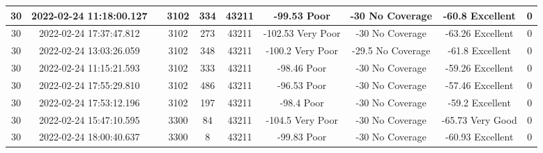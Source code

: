 \begin{longtable*}{|c|c|c|c|c|c|c|c|c|c|}
30&2022-02-24 11:18:00.127&&3102&334&43211& -99.53    Poor        & -30       No Coverage & -60.8     Excellent   & 0\\\hline
{}30&2022-02-24 17:37:47.812&&3102&273&43211& -102.53   Very Poor   & -30       No Coverage & -63.26    Excellent   & 0\\\hline
{}30&2022-02-24 13:03:26.059&&3102&348&43211& -100.2    Very Poor   & -29.5     No Coverage & -61.8     Excellent   & 0\\\hline
{}30&2022-02-24 11:15:21.593&&3102&333&43211& -98.46    Poor        & -30       No Coverage & -59.26    Excellent   & 0\\\hline
{}30&2022-02-24 17:55:29.810&&3102&486&43211& -96.53    Poor        & -30       No Coverage & -57.46    Excellent   & 0\\\hline
{}30&2022-02-24 17:53:12.196&&3102&197&43211& -98.4     Poor        & -30       No Coverage & -59.2     Excellent   & 0\\\hline
{}30&2022-02-24 15:47:10.595&&3300&84&43211& -104.5    Very Poor   & -30       No Coverage & -65.73    Very Good   & 0\\\hline
{}30&2022-02-24 18:00:40.637&&3300&8&43211& -99.83    Poor        & -30       No Coverage & -60.93    Excellent   & 0\\\hline

\end{longtable*}
